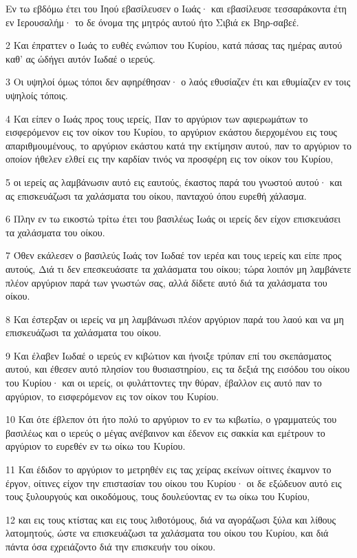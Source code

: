 \par Εν τω εβδόμω έτει του Ιηού εβασίλευσεν ο Ιωάς· και εβασίλευσε τεσσαράκοντα έτη εν Ιερουσαλήμ· το δε όνομα της μητρός αυτού ήτο Σιβιά εκ Βηρ-σαβεέ.
\par 2 Και έπραττεν ο Ιωάς το ευθές ενώπιον του Κυρίου, κατά πάσας τας ημέρας αυτού καθ' ας ώδήγει αυτόν Ιωδαέ ο ιερεύς.
\par 3 Οι υψηλοί όμως τόποι δεν αφηρέθησαν· ο λαός εθυσίαζεν έτι και εθυμίαζεν εν τοις υψηλοίς τόποις.
\par 4 Και είπεν ο Ιωάς προς τους ιερείς, Παν το αργύριον των αφιερωμάτων το εισφερόμενον εις τον οίκον του Κυρίου, το αργύριον εκάστου διερχομένου εις τους απαριθμουμένους, το αργύριον εκάστου κατά την εκτίμησιν αυτού, παν το αργύριον το οποίον ήθελεν ελθεί εις την καρδίαν τινός να προσφέρη εις τον οίκον του Κυρίου,
\par 5 οι ιερείς ας λαμβάνωσιν αυτό εις εαυτούς, έκαστος παρά του γνωστού αυτού· και ας επισκευάζωσι τα χαλάσματα του οίκου, πανταχού όπου ευρεθή χάλασμα.
\par 6 Πλην εν τω εικοστώ τρίτω έτει του βασιλέως Ιωάς οι ιερείς δεν είχον επισκευάσει τα χαλάσματα του οίκου.
\par 7 Όθεν εκάλεσεν ο βασιλεύς Ιωάς τον Ιωδαέ τον ιερέα και τους ιερείς και είπε προς αυτούς, Διά τι δεν επεσκευάσατε τα χαλάσματα του οίκου; τώρα λοιπόν μη λαμβάνετε πλέον αργύριον παρά των γνωστών σας, αλλά δίδετε αυτό διά τα χαλάσματα του οίκου.
\par 8 Και έστερξαν οι ιερείς να μη λαμβάνωσι πλέον αργύριον παρά του λαού και να μη επισκευάζωσι τα χαλάσματα του οίκου.
\par 9 Και έλαβεν Ιωδαέ ο ιερεύς εν κιβώτιον και ήνοιξε τρύπαν επί του σκεπάσματος αυτού, και έθεσεν αυτό πλησίον του θυσιαστηρίου, εις τα δεξιά της εισόδου του οίκου του Κυρίου· και οι ιερείς, οι φυλάττοντες την θύραν, έβαλλον εις αυτό παν το αργύριον, το εισφερόμενον εις τον οίκον του Κυρίου.
\par 10 Και ότε έβλεπον ότι ήτο πολύ το αργύριον το εν τω κιβωτίω, ο γραμματεύς του βασιλέως και ο ιερεύς ο μέγας ανέβαινον και έδενον εις σακκία και εμέτρουν το αργύριον το ευρεθέν εν τω οίκω του Κυρίου.
\par 11 Και έδιδον το αργύριον το μετρηθέν εις τας χείρας εκείνων οίτινες έκαμνον το έργον, οίτινες είχον την επιστασίαν του οίκου του Κυρίου· οι δε εξώδευον αυτό εις τους ξυλουργούς και οικοδόμους, τους δουλεύοντας εν τω οίκω του Κυρίου,
\par 12 και εις τους κτίστας και εις τους λιθοτόμους, διά να αγοράζωσι ξύλα και λίθους λατομητούς, ώστε να επισκευάζωσι τα χαλάσματα του οίκου του Κυρίου, και διά πάντα όσα εχρειάζοντο διά την επισκευήν του οίκου.
